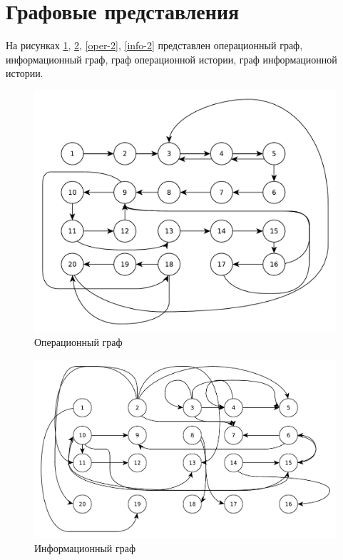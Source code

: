 \section{Графовые представления}

На рисунках \ref{oper-1}, \ref{info-1}, \ref{oper-2}, \ref{info-2} представлен операционный граф, информационный граф, граф операционной истории, граф информационной истории.

\begin{figure}[ht!]
	\centering
	\includegraphics[width=1\linewidth]{assets/graphs/operation.pdf}
	\captionsetup{singlelinecheck = false, justification=centerfirst}
	\caption{Операционный граф}
	\label{oper-1}
\end{figure}
\begin{figure}[ht!]
	\centering
	\includegraphics[width=1\linewidth]{assets/graphs/inforamtion.pdf}
	\captionsetup{singlelinecheck = false, justification=centerfirst}
	\caption{Информационный граф}
	\label{info-1}
\end{figure}
